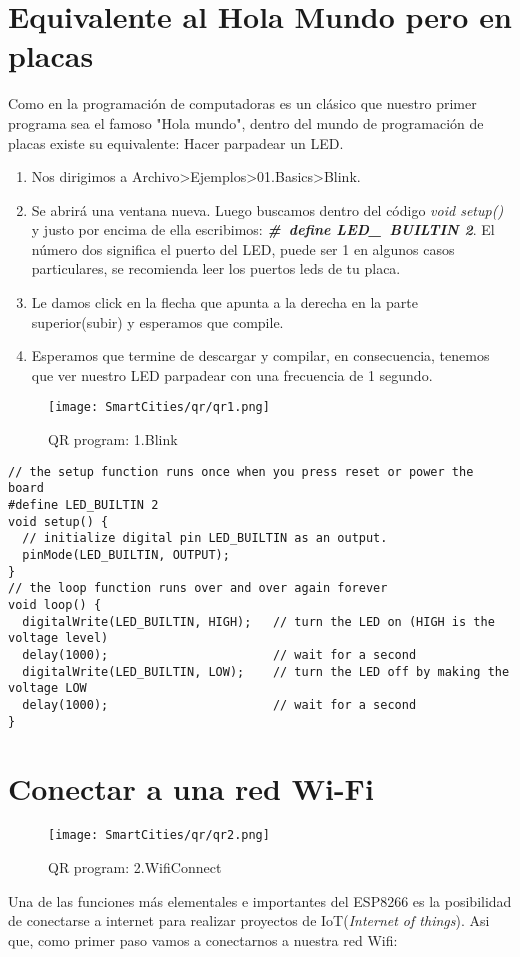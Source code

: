 \documentclass[
	12pt, %
	fleqn, %
	a4paper, %
]{LegrandOrangeBook}
\begin{document}
\section{Equivalente al Hola Mundo pero en placas}
Como en la programación de computadoras es un clásico que nuestro primer programa sea el famoso "Hola mundo", dentro del mundo de programación de placas existe su equivalente: Hacer parpadear un LED.
\begin{enumerate}
\item Nos dirigimos a Archivo>Ejemplos>01.Basics>Blink.
\item Se abrirá una ventana nueva. Luego buscamos dentro del código \textit{void setup()} y justo por encima de ella escribimos: \textit{\textbf{\#\ define LED\_\ BUILTIN 2}}. El número dos significa el puerto del LED, puede ser 1 en algunos casos particulares, se recomienda leer los puertos leds de tu placa.
\item Le damos click en la flecha que apunta a la derecha en la parte superior(subir) y esperamos que compile.
\item Esperamos que termine de descargar y compilar, en consecuencia, tenemos que ver nuestro LED parpadear con una frecuencia de 1 segundo.
\end{enumerate}
\begin{figure}[H]
\centering\texttt{[image: SmartCities/qr/qr1.png]}
\caption{QR program: 1.Blink}
\label{fig:qr1}
\end{figure}
\begin{lstlisting}[caption={Blink Program},captionpos=b,frame=single]
// the setup function runs once when you press reset or power the board
#define LED_BUILTIN 2
void setup() {
  // initialize digital pin LED_BUILTIN as an output.
  pinMode(LED_BUILTIN, OUTPUT);
}
// the loop function runs over and over again forever
void loop() {
  digitalWrite(LED_BUILTIN, HIGH);   // turn the LED on (HIGH is the voltage level)
  delay(1000);                       // wait for a second
  digitalWrite(LED_BUILTIN, LOW);    // turn the LED off by making the voltage LOW
  delay(1000);                       // wait for a second
}
\end{lstlisting}
\section{Conectar a una red Wi-Fi}
\begin{wrapfigure}{r}{0.1\linewidth}
\centering\texttt{[image: SmartCities/qr/qr2.png]}
\caption{QR program: 2.WifiConnect}
\label{fig:qr2}
\end{wrapfigure}
Una de las funciones más elementales e importantes del ESP8266 es la posibilidad de conectarse a internet para realizar proyectos de IoT(\textit{Internet of things}). Asi que, como primer paso vamos a conectarnos a nuestra red Wifi:
\end{document}

